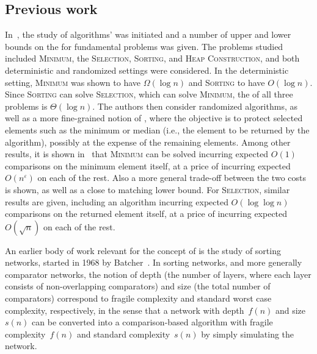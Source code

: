 

\subsection{Previous work}
In~\cite{afshani:fragile-ESA19}, the study of algorithms' \frag was
initiated and a number of upper and lower bounds on the \frag for
fundamental problems was given. The problems studied included
\textsc{Minimum}, the \textsc{Selection}, \textsc{Sorting}, and
\textsc{Heap Construction}, and both deterministic and randomized
settings were considered.
%
In the deterministic setting, \textsc{Minimum} was shown to have \frag
$\Omega(\log n)$ and \textsc{Sorting} to have \frag $O(\log n)$. Since
\textsc{Sorting} can solve \textsc{Selection}, which can solve
\textsc{Minimum}, the \frag of all three problems is $\Theta(\log
n)$. The authors then consider randomized algorithms, as well as a
more fine-grained notion of \frag, where the objective is to protect
selected elements such as the minimum or median (i.e., the element to
be returned by the algorithm), possibly at the expense of the
remaining elements.
Among other results, it is shown in~\cite{afshani:fragile-ESA19} that
\textsc{Minimum} can be solved incurring expected $O(1)$ comparisons
on the minimum element itself, at a price of incurring expected
$O(n^{\varepsilon})$ on each of the rest. Also a more general
trade-off between the two costs is shown, as well as a close to
matching lower bound. For \textsc{Selection}, similar results are
given, including an algorithm incurring expected $O(\log \log n)$
comparisons on the returned element itself, at a price of incurring
expected $O(\sqrt{n})$ on each of the rest.

An earlier body of work relevant for the concept of \frag is the study
of sorting networks, started in 1968 by Batcher~\cite{Batc68}. In
sorting networks, and more generally comparator networks, the notion
of depth (the number of layers, where each layer consists of
non-overlapping comparators) and size (the total number of
comparators) correspond to fragile complexity and standard worst case
complexity, respectively, in the sense that a network with
depth~$f(n)$ and size~$s(n)$ can be converted into a comparison-based
algorithm with fragile complexity~$f(n)$ and standard
complexity~$s(n)$ by simply simulating the network.

